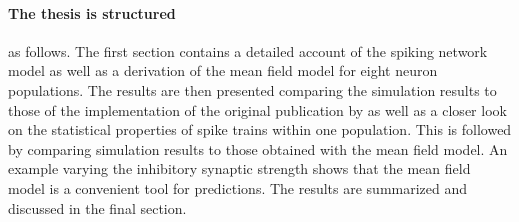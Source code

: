 \paragraph{The thesis is structured} as follows. The first section contains a detailed account 
of the spiking network model as well as a derivation of the mean field model 
for eight neuron populations.  
The results are then presented comparing the simulation results to 
those of the implementation of the original publication by 
 as well as a closer look on the statistical properties 
of spike trains within one population. 
This is followed by comparing simulation results to those
obtained with the mean field model. 
An example varying the inhibitory synaptic strength shows
that the mean field model is a convenient tool for predictions.
The results are summarized and discussed in the final section. 




